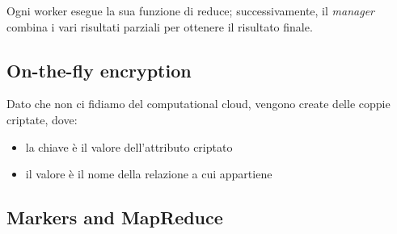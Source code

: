 \documentclass{report}
\begin{document}
\noindent Ogni worker esegue la sua funzione di reduce; successivamente, il \textit{manager} combina i vari risultati parziali 
per ottenere il risultato finale.

\subsection{On-the-fly encryption}
Dato che non ci fidiamo del computational cloud, 
vengono create delle coppie criptate, dove:
\begin{itemize}
    \item la chiave è il valore dell'attributo criptato 
    \item il valore è il nome della relazione a cui appartiene 
\end{itemize}


\subsection{Markers and MapReduce}
\end{document}
